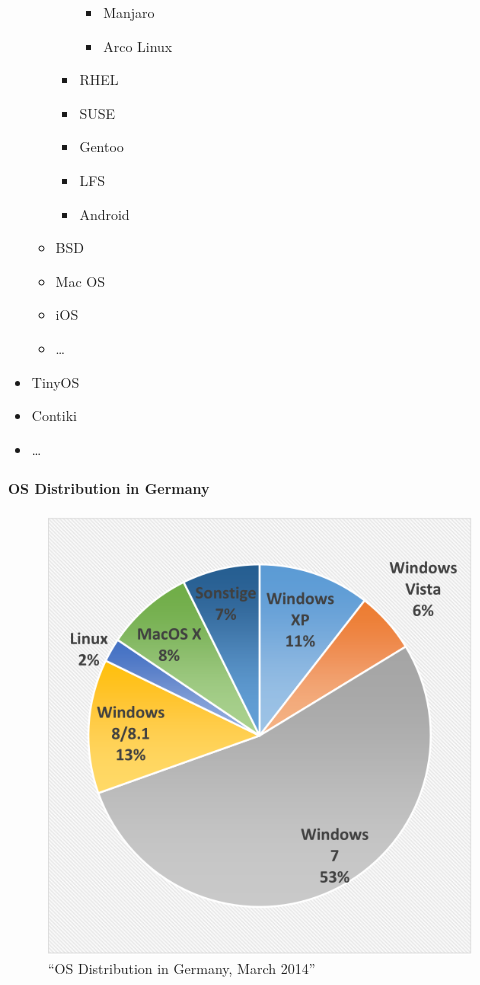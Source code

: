 \documentclass[
]{article}
\providecommand{\tightlist}{%
  \setlength{\itemsep}{0pt}\setlength{\parskip}{0pt}}
\begin{document}
\begin{itemize}
\begin{itemize}
\begin{itemize}
      \begin{itemize}
      \tightlist
      \item
        Manjaro
      \item
        Arco Linux
      \end{itemize}
    \item
      RHEL
    \item
      SUSE
    \item
      Gentoo
    \item
      LFS
    \item
      Android
    \end{itemize}
  \item
    BSD
  \item
    Mac OS
  \item
    iOS
  \item
    \ldots{}
  \end{itemize}
\item
  TinyOS
\item
  Contiki
\item
  \ldots{}
\end{itemize}

\newpage
\hypertarget{os-distribution-in-germany}{%
\paragraph{OS Distribution in
Germany}\label{os-distribution-in-germany}}


  \begin{figure}[h]
  \centering
  \includegraphics{../images/os_dist_g_2014.png}
  \caption{``OS Distribution in Germany, March 2014''}
  \end{figure}
\end{document}
